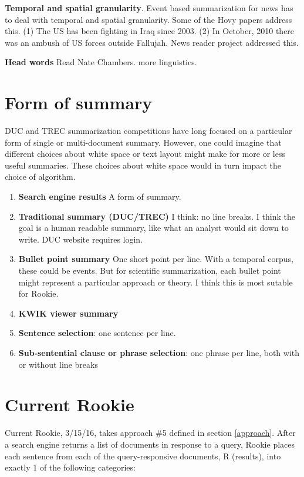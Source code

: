 \documentclass[11pt]{article}
\begin{document}
\textbf{Temporal and spatial granularity}. Event based summarization for news has to deal with temporal and spatial granularity. Some of the Hovy papers address this. (1) The US has been fighting in Iraq since 2003. (2) In October, 2010 there was an ambush of US forces outside Fallujah. News reader project addressed this.

\textbf{Head words} Read Nate Chambers. more linguistics.

\section{Form of summary}

DUC and TREC summarization competitions have long focused on a particular form of single or multi-document summary. However, one could imagine that different choices about white space or text layout might make for more or less useful summaries. These choices about white space would in turn impact the choice of algorithm.

\begin{enumerate}\label{approach}
  \item \textbf{Search engine results} A form of summary.
  \item \textbf{Traditional summary (DUC/TREC)} I think: no line breaks. I think the goal is a human readable summary, like what an analyst would sit down to write. DUC website requires login. 
  \item \textbf{Bullet point summary} One short point per line. With a temporal corpus, these could be events. But for scientific summarization, each bullet point might represent a particular approach or theory. I think this is most sutable for Rookie.
  \item \textbf{KWIK viewer summary}
  \item \textbf{Sentence selection}: one sentence per line.
  \item \textbf{Sub-sentential clause or phrase selection}: one phrase per line, both with or without line breaks
\end{enumerate}

\section{Current Rookie}

Current Rookie, 3/15/16, takes approach \#5 defined in section \ref{approach}. After a search engine returns a list of documents in response to a query, Rookie places each sentence from each of the query-responsive documents, R (results), into exactly 1 of the following categories: 
\end{document}
